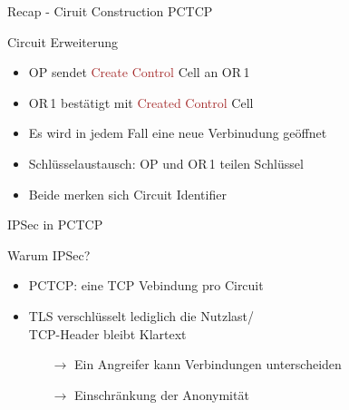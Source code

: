 \documentclass{beamer}
\begin{document}
\begin{frame}{Recap - Ciruit Construction PCTCP}{\secname}
  \begin{center}
  \end{center}
  \begin{block}{Circuit Erweiterung}
    \begin{itemize}
      \item OP sendet \textcolor{brown}{Create Control} Cell an OR\,1
      \item OR\,1 bestätigt mit \textcolor{brown}{Created Control} Cell
      \item {\color{red}Es wird in jedem Fall eine neue Verbinudung geöffnet}
      \item Schlüsselaustausch: OP und OR\,1 teilen Schlüssel
      \item Beide merken sich Circuit Identifier
    \end{itemize}
  \end{block}
\end{frame}


\begin{frame}{IPSec in PCTCP}{\secname}
  \begin{block}{Warum IPSec?}
    \begin{itemize}
      \item PCTCP: eine TCP Vebindung pro Circuit
      \item TLS verschlüsselt lediglich die Nutzlast/\\ TCP-Header bleibt Klartext
      \begin{itemize}
        \item[$\rightarrow$] Ein Angreifer kann Verbindungen unterscheiden
        \item[$\rightarrow$] Einschränkung der Anonymität
      \end{itemize}
    \end{itemize}
  \end{block} 
\end{frame}
\end{document}
